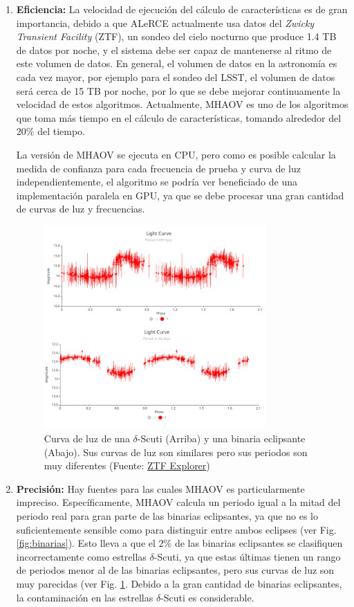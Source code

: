 \begin{enumerate}
    \item {\bf Eficiencia:} La velocidad de ejecución del cálculo de características es de gran importancia, debido a que ALeRCE actualmente usa datos del {\it Zwicky Transient Facility} (ZTF), un sondeo del cielo nocturno que produce 1.4 TB de datos por noche, y el sistema debe ser capaz de mantenerse al ritmo de este volumen de datos. En general, el volumen de datos en la astronomía es cada vez mayor, por ejemplo para el sondeo del LSST, el volumen de datos será cerca de 15 TB por noche, por lo que se debe mejorar continuamente la velocidad de estos algoritmos. Actualmente, MHAOV es uno de los algoritmos que toma más tiempo en el cálculo de características, tomando alrededor del $20\%$ del tiempo.

    La versión de MHAOV se ejecuta en CPU, pero como es posible calcular la medida de confianza para cada frecuencia de prueba y curva de luz independientemente, el algoritmo se podría ver beneficiado de una implementación paralela en GPU, ya que se debe procesar una gran cantidad de curvas de luz y frecuencias.
\begin{figure}[h]
    \centering
    \includegraphics[width=0.8\textwidth]{./figs/scutti-vs-eb.png}
    \caption{Curva de luz de una $\delta$-Scuti (Arriba) y una binaria eclipsante (Abajo). Sus curvas de luz son similares pero sus periodos son muy diferentes (Fuente: \href{https://alerce.online/}{ZTF Explorer})}
    \label{fig:scuti-vs-eb}
\end{figure}
    \item {\bf Precisión:} Hay fuentes para las cuales MHAOV es particularmente impreciso. Específicamente, MHAOV calcula un periodo igual a la mitad del periodo real para gran parte de las binarias eclipsantes, ya que no es lo suficientemente sensible como para distinguir entre ambos eclipses (ver Fig. \ref{fig:binarias}). Esto lleva a que el $2\%$ de las binarias eclipsantes se clasifiquen incorrectamente como estrellas $\delta$-Scuti, ya que estas últimas tienen un rango de periodos menor al de las binarias eclipsantes, pero sus curvas de luz son muy parecidas (ver Fig. \ref{fig:scuti-vs-eb}. Debido a la gran cantidad de binarias eclipsantes, la contaminación en las estrellas $\delta$-Scuti es considerable.


\end{enumerate}
